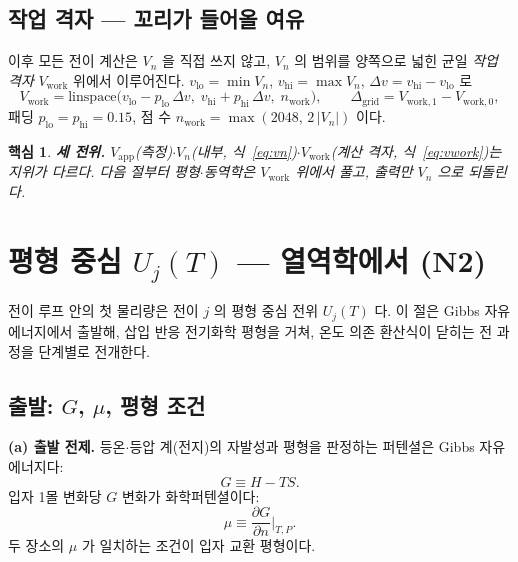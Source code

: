 \documentclass[11pt,a4paper]{article}
\newtheorem*{keybox}{핵심}
\newcommand{\app}{\mathrm{app}}
\newcommand{\work}{\mathrm{work}}
\begin{document}
\subsection{작업 격자 — 꼬리가 들어올 여유}
이후 모든 전이 계산은 $V_n$ 을 직접 쓰지 않고, $V_n$ 의 범위를 양쪽으로 넓힌 균일 \emph{작업 격자} $V_\work$ 위에서
이루어진다. $v_\mathrm{lo}=\min V_n$, $v_\mathrm{hi}=\max V_n$, $\Delta v=v_\mathrm{hi}-v_\mathrm{lo}$ 로
\begin{equation}
V_\work=\mathrm{linspace}\big(v_\mathrm{lo}-p_\mathrm{lo}\,\Delta v,\;
v_\mathrm{hi}+p_\mathrm{hi}\,\Delta v,\;n_\work\big),
\qquad \Delta_\mathrm{grid}=V_{\work,1}-V_{\work,0},
\label{eq:vwork}
\end{equation}
패딩 $p_\mathrm{lo}=p_\mathrm{hi}=0.15$, 점 수 $n_\work=\max(2048,\,2\,|V_n|)$ 이다.

\begin{keybox}
\textbf{세 전위.} $V_\app$(측정)$\cdot$$V_n$(내부, 식~\eqref{eq:vn})$\cdot$$V_\work$(계산 격자, 식~\eqref{eq:vwork})는
지위가 다르다. 다음 절부터 평형$\cdot$동역학은 $V_\work$ 위에서 풀고, 출력만 $V_n$ 으로 되돌린다.
\end{keybox}

\section{평형 중심 $U_j(T)$ — 열역학에서 (N2)}\label{sec:center}
전이 루프 안의 첫 물리량은 전이 $j$ 의 평형 중심 전위 $U_j(T)$ 다. 이 절은 Gibbs 자유에너지에서 출발해,
삽입 반응 전기화학 평형을 거쳐, 온도 의존 환산식이 닫히는 전 과정을 단계별로 전개한다.

\subsection{출발: $G$, $\mu$, 평형 조건}

\textbf{(a) 출발 전제.} 등온$\cdot$등압 계(전지)의 자발성과 평형을 판정하는 퍼텐셜은 Gibbs 자유에너지다:
\begin{equation}
G \equiv H - TS.
\label{eq:gibbsdef}
\end{equation}
입자 1몰 변화당 $G$ 변화가 화학퍼텐셜이다:
\begin{equation}
\mu \equiv \frac{\partial G}{\partial n}\bigg|_{T,P}.
\label{eq:mudef}
\end{equation}
두 장소의 $\mu$ 가 일치하는 조건이 입자 교환 평형이다.
\end{document}
